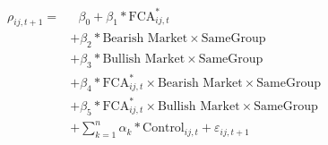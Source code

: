 \begin{equation}
\begin{split}
\rho_{ij,t+1} = & \text{ 	}\beta_0 + \beta_1*\text{FCA}^*_{ij,t}\\
& +\beta_2 * {\text{Bearish Market} } \times {\text{SameGroup} }  \\
& + 
\beta_3 *{\text{Bullish Market} } \times {\text{SameGroup} }\\
& 
 + \beta_4 * \text{FCA}^*_{ij,t} \times {\text{Bearish Market} } \times {\text{SameGroup} }\\
&
+ \beta_5 * \text{FCA}^*_{ij,t} \times {\text{Bullish Market} } \times {\text{SameGroup} }\\
  & + \sum_{k=1} ^{n} \alpha_k*\text{Control}_{ij,t} + \varepsilon_{ij,t+1}
\end{split}
\end{equation}